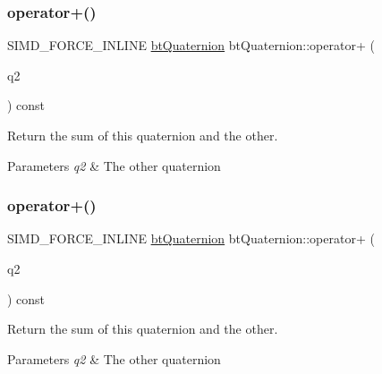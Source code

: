 \subsubsection{\texorpdfstring{operator+()}{operator+()}\hspace{0.1cm}{\footnotesize\ttfamily [1/2]}}
{\footnotesize\ttfamily S\+I\+M\+D\+\_\+\+F\+O\+R\+C\+E\+\_\+\+I\+N\+L\+I\+NE \hyperlink{classbtQuaternion}{bt\+Quaternion} bt\+Quaternion\+::operator+ (\begin{DoxyParamCaption}\item[{const \hyperlink{classbtQuaternion}{bt\+Quaternion} \&}]{q2 }\end{DoxyParamCaption}) const\hspace{0.3cm}{\ttfamily [inline]}}



Return the sum of this quaternion and the other. 


\begin{DoxyParams}{Parameters}
{\em q2} & The other quaternion \\
\hline
\end{DoxyParams}
\mbox{\label{classbtQuaternion_a70cace8911befee9f0684391d16985d0}} 
\subsubsection{\texorpdfstring{operator+()}{operator+()}\hspace{0.1cm}{\footnotesize\ttfamily [2/2]}}
{\footnotesize\ttfamily S\+I\+M\+D\+\_\+\+F\+O\+R\+C\+E\+\_\+\+I\+N\+L\+I\+NE \hyperlink{classbtQuaternion}{bt\+Quaternion} bt\+Quaternion\+::operator+ (\begin{DoxyParamCaption}\item[{const \hyperlink{classbtQuaternion}{bt\+Quaternion} \&}]{q2 }\end{DoxyParamCaption}) const\hspace{0.3cm}{\ttfamily [inline]}}



Return the sum of this quaternion and the other. 


\begin{DoxyParams}{Parameters}
{\em q2} & The other quaternion \\
\hline
\end{DoxyParams}
\mbox{\label{classbtQuaternion_a1212e4cbaa71da187984d3c174a4cc04}} 
